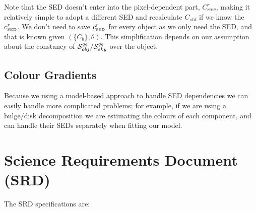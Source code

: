 \documentclass[12pt]{article}
\newcommand{\qe}{{\cal S}}
\begin{document}
Note that the SED doesn't enter into the pixel-dependent part, $C_{raw}^r$, making it relatively simple to
adopt a different SED and recalculate $C_{std}$ if we know the $c_{\scriptscriptstyle\rm SED}^r$.  We don't need to save $c_{\scriptscriptstyle\rm SED}^r$
for every object as we only need the SED, and that is known given $(\{C_b\}, \theta)$.  This simplification
depends on our assumption about the constancy of $\qe_{obj}^{qe}/\qe_{sky}^{qe}$ over the object.

\subsection{Colour Gradients}

Because we using a model-based approach to handle SED dependencies we can easily handle more complicated
problems; for example, if we are using a bulge/disk decomposition we are estimating the colours of each
component, and can handle their SEDs separately when fitting our model.

\appendix

\section{Science Requirements Document (SRD)}
\label{appSRD}

The SRD specifications are:
\end{document}
